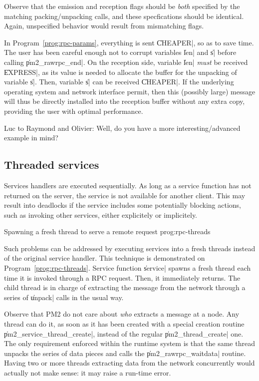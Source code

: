 Observe that the emission and reception flags should be \emph{both}
specified  by the matching packing/unpacking calls, and these
specfications should be identical. Again, unspecified behavior would
result from mismatching flags.

In Program~\ref{prog:rpc-params}, everything is sent \|CHEAPER|, so as
to save time. The user has been careful enough not to corrupt
variables \|len| and \|s| before calling \|pm2_rawrpc_end|. On the
reception side, variable \|len| \emph{must} be received \|EXPRESS|, as
its value is needed to allocate the buffer for the unpacking of
variable \|s|.  Then, variable \|s| can be received \|CHEAPER|. If the
underlying operating system and network interface permit, then this
(possibly large) message will thus be directly installed into the
reception buffer without any extra copy, providing the user with
optimal performance.



\begin{note}
  Luc to Raymond and Olivier: Well, do you have a more
  interesting/advanced example in mind?
\end{note}

\subsection{Threaded services}

Services handlers are executed sequentially. As long as a service
function has not returned on the server, the service is not available
for another client. This may result into deadlocks if the service
includes some potentially blocking actions, such as invoking other
services, either explicitely or implicitely.

 {Spawning a fresh thread to serve a
  remote request} {prog:rpc-threads}

Such problems can be addressed by executing services into a fresh
threads instead of the original service handler. This technique is
demonstrated on Program~\ref{prog:rpc-threads}. Service function
\|service| spawns a fresh thread each time it is invoked
through a RPC request. Then, it immediately returns. The child thread
is in charge of extracting the message from the network through a series
of \|unpack| calls in the usual way. 

Observe that PM2 do not care about \emph{who} extracts a message at a
node. Any thread can do it, as soon as it has been created with a
special creation routine \|pm2_service_thread_create|, instead of the
regular \|pm2_thread_create| one. The only requirement enforced within
the runtime system is that the same thread unpacks the series of data
pieces and calls the \|pm2_rawrpc_waitdata| routine. Having two or
more threads extracting data from the network concurrently would
actually not make sense: it may raise a run-time error.

